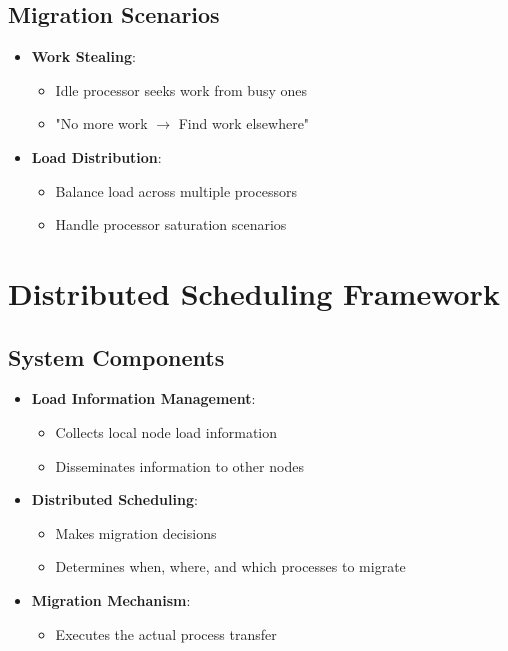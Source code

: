 \documentclass[12pt]{article}
\begin{document}
\subsection{Migration Scenarios}
\begin{itemize}
\item \textbf{Work Stealing}:
  \begin{itemize}
  \item Idle processor seeks work from busy ones
  \item "No more work $\rightarrow$ Find work elsewhere"
  \end{itemize}
  
\item \textbf{Load Distribution}:
  \begin{itemize}
  \item Balance load across multiple processors
  \item Handle processor saturation scenarios
  \end{itemize}
\end{itemize}

\section{Distributed Scheduling Framework}

\subsection{System Components}
\begin{itemize}
\item \textbf{Load Information Management}:
  \begin{itemize}
  \item Collects local node load information
  \item Disseminates information to other nodes
  \end{itemize}
  
\item \textbf{Distributed Scheduling}:
  \begin{itemize}
  \item Makes migration decisions
  \item Determines when, where, and which processes to migrate
  \end{itemize}
  
\item \textbf{Migration Mechanism}:
  \begin{itemize}
  \item Executes the actual process transfer
  \end{itemize}
\end{itemize}
\end{document}
